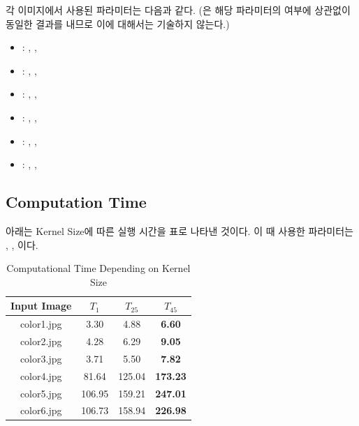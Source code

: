 \documentclass{report}
\begin{document}
각 이미지에서 사용된 파라미터는 다음과 같다. (은 해당 파라미터의 여부에 상관없이 동일한 결과를 내므로 이에 대해서는 기술하지 않는다.)

\begin{itemize}
    \item {} : , , 
    \item {} : , , 
    \item {} : , , 
    \item {} : , , 
    \item {} : , , 
    \item {} : , , 
\end{itemize}

\subsection*{Computation Time}


아래는 Kernel Size에 따른 실행 시간을 표로 나타낸 것이다. 이 때 사용한 파라미터는 , , 이다.

\begin{table}[h]
    \centering
    \begin{tabular}{@{}cccc@{}}
        \hline
        Input Image & $T_{1}$ & $T_{25}$ & $T_{45}$ \\
        \hline
        color1.jpg & 3.30 & 4.88 & \textbf{6.60} \\
        color2.jpg & 4.28 & 6.29 & \textbf{9.05} \\
        color3.jpg & 3.71 & 5.50 & \textbf{7.82} \\
        color4.jpg & 81.64 & 125.04 & \textbf{173.23} \\
        color5.jpg & 106.95 & 159.21 & \textbf{247.01} \\
        color6.jpg & 106.73 & 158.94 & \textbf{226.98} \\
      \hline
    \end{tabular}
    \caption{Computational Time Depending on Kernel Size}
\end{table}
\end{document}
